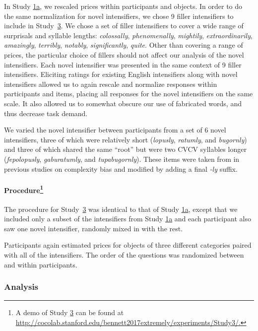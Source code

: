 \documentclass[10pt,letterpaper]{article}
\newcommand{\w}[1]{\emph{#1}}
\begin{document}
In Study \hyperref[sec:study1a]{1a}, we rescaled prices within participants and objects.
In order to do the same normalization for novel intensifiers, we chose 9 filler intensifiers to include in Study~\hyperref[sec:study3]{3}.
We chose a set of filler intensifiers to cover a wide range of surprisals and syllable lengths: \w{colossally}, \w{phenomenally}, \w{mightily}, \w{extraordinarily}, \w{amazingly}, \w{terribly}, \w{notably}, \w{significantly}, \w{quite}.
Other than covering a range of prices, the particular choice of fillers should not affect our analysis of the novel intensifiers.
Each novel intensifier was presented in the same context of 9 filler intensifiers.
Eliciting ratings for existing English intensifiers along with novel intensifiers allowed us to again rescale and normalize responses within participants and items, placing all responses for the novel intensifiers on the same scale.
It also allowed us to somewhat obscure our use of fabricated words, and thus decrease task demand.

We varied the novel intensifier between participants from a set of 6 novel intensifiers, three of which were relatively short (\w{lopusly}, \w{ratumly}, and \w{bugornly}) and three of which shared the same ``root'' but were two CVCV syllables longer (\w{fepolopusly}, \w{gaburatumly}, and \w{tupabugornly}).
These items were taken from in previous studies on complexity bias \cite{lewis_conceptual_2016} and modified by adding a final \w{-ly} suffix.

\paragraph{Procedure\footnote{A demo of Study \hyperref[sec:study3]{3} can be found at \url{http://cocolab.stanford.edu/bennett2017extremely/experiments/Study3/.}}}

The procedure for Study~\hyperref[sec:study3]{3} was identical to that of Study \hyperref[sec:study1a]{1a}, except that we included only a subset of the intensifiers from Study \hyperref[sec:study1a]{1a} and each participant also saw one novel intensifier, randomly mixed in with the rest.

Participants again estimated prices for objects of three different categories paired with all of the intensifiers.
The order of the questions was randomized between and within participants.

\subsubsection{Analysis}
\end{document}
